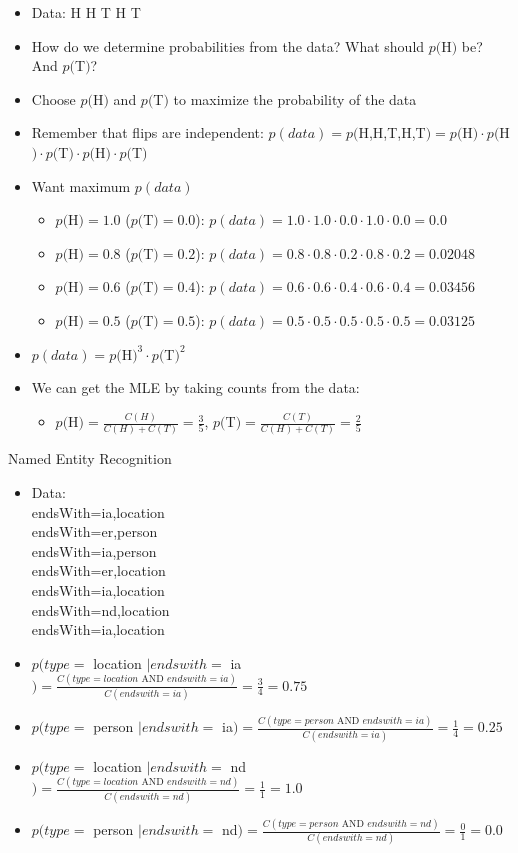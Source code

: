 \documentclass[11pt,letterpaper]{article}
\begin{document}
\begin{itemize}
  \item Data: H H T H T
  \item How do we determine probabilities from the data?  What should $p($H$)$ be? And $p($T$)$?
  \item Choose $p($H$)$ and $p($T$)$ to maximize the probability of the data
  \item Remember that flips are independent: $p(data) = p($H,H,T,H,T$) = p($H$) \cdot p($H$) \cdot p($T$) \cdot p($H$) \cdot p($T$)$
  \item Want maximum $p(data)$
  \begin{itemize}
    \item $p($H$) = 1.0$ ($p($T$) = 0.0$): $p(data) = 1.0 \cdot 1.0 \cdot 0.0 \cdot 1.0 \cdot 0.0 = 0.0$
    \item $p($H$) = 0.8$ ($p($T$) = 0.2$): $p(data) = 0.8 \cdot 0.8 \cdot 0.2 \cdot 0.8 \cdot 0.2 = 0.02048$
    \item $p($H$) = 0.6$ ($p($T$) = 0.4$): $p(data) = 0.6 \cdot 0.6 \cdot 0.4 \cdot 0.6 \cdot 0.4 = \mathbf{0.03456}$
    \item $p($H$) = 0.5$ ($p($T$) = 0.5$): $p(data) = 0.5 \cdot 0.5 \cdot 0.5 \cdot 0.5 \cdot 0.5 = 0.03125$
  \end{itemize}
  \item $p(data) = p($H$)^3 \cdot p($T$)^2$
  \item We can get the MLE by taking counts from the data: 
  \begin{itemize}
    \item $p($H$) = \frac{C(H)}{C(H) + C(T)} = \frac{3}{5}$, $p($T$) = \frac{C(T)}{C(H) + C(T)} = \frac{2}{5}$
  \end{itemize}
\end{itemize}

Named Entity Recognition

\begin{itemize}
  \item Data: \\
  endsWith=ia,location\\
  endsWith=er,person\\
  endsWith=ia,person\\
  endsWith=er,location\\
  endsWith=ia,location\\
  endsWith=nd,location\\
  endsWith=ia,location
  \item $p(type = $ location $ \mid endswith = $ ia$) = \frac{C(type = location \text{ AND } endswith = ia)}{C(endswith = ia)} = \frac{3}{4} = 0.75$
  \item $p(type = $ person $ \mid endswith = $ ia$) = \frac{C(type = person \text{ AND } endswith = ia)}{C(endswith = ia)} = \frac{1}{4} = 0.25$
  \item $p(type = $ location $ \mid endswith = $ nd$) = \frac{C(type = location \text{ AND } endswith = nd)}{C(endswith = nd)} = \frac{1}{1} = 1.0$
  \item $p(type = $ person $ \mid endswith = $ nd$) = \frac{C(type = person \text{ AND } endswith = nd)}{C(endswith = nd)} = \frac{0}{1} = 0.0$
\end{itemize}
\end{document}
